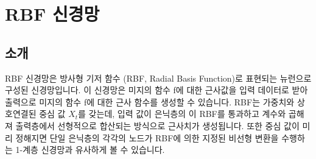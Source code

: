 \section{RBF 신경망}  

\subsection{소개}
RBF 신경망은 방사형 기저 함수 (RBF, Radial Basis Function)로 표현되는 뉴런으로 구성된 신경망입니다. 이 신경망은 미지의 함수 f에 대한 근사값을 입력 데이터로 받아 출력으로 미지의 함수 f에 대한 근사 함수를 생성할 수 있습니다. RBF는 가중치와 상호연결된 중심 값 \(X_{t}\)를 갖는데, 입력 값이 은닉층의 이 RBF를 통과하고 계수와 곱해져 출력층에서 선형적으로 합산되는 방식으로 근사치가 생성됩니다. \cite{574355} 또한 중심 값이 미리 정해지면 단일 은닉층의 각각의 노드가 RBF에 의한 지정된 비선형 변환을 수행하는 1-계층 신경망과 유사하게 볼 수 있습니다. \cite{298229}

